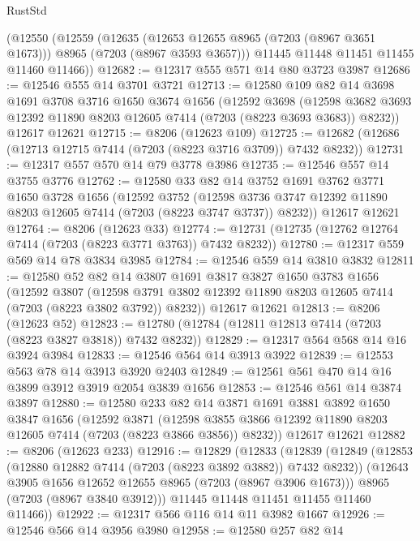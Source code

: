 \begin{lexlean}{RustStd}
\begin{coremodule}
    (@12550
      (@12559
        (@12635 (@12653 @12655 @8965 (@7203 (@8967 @3651 @1673))) @8965 (@7203 (@8967 @3593 @3657)))
        @11445
        @11448
        @11451
        @11455
        @11460
        @11466))
@12682 := @12317 @555 @571 @14 @80 @3723 @3987
@12686 := @12546 @555 @14 @3701 @3721
@12713 := @12580
    @109
    @82
    @14
    @3698
    @1691
    @3708
    @3716
    @1650
    @3674
    @1656
    (@12592
      @3698
      (@12598 @3682 @3693 @12392 @11890 @8203 @12605 @7414 (@7203 (@8223 @3693 @3683)) @8232))
    @12617
    @12621
@12715 := @8206 (@12623 @109)
@12725 := @12682 (@12686 (@12713 @12715 @7414 (@7203 (@8223 @3716 @3709)) @7432 @8232))
@12731 := @12317 @557 @570 @14 @79 @3778 @3986
@12735 := @12546 @557 @14 @3755 @3776
@12762 := @12580
    @33
    @82
    @14
    @3752
    @1691
    @3762
    @3771
    @1650
    @3728
    @1656
    (@12592
      @3752
      (@12598 @3736 @3747 @12392 @11890 @8203 @12605 @7414 (@7203 (@8223 @3747 @3737)) @8232))
    @12617
    @12621
@12764 := @8206 (@12623 @33)
@12774 := @12731 (@12735 (@12762 @12764 @7414 (@7203 (@8223 @3771 @3763)) @7432 @8232))
@12780 := @12317 @559 @569 @14 @78 @3834 @3985
@12784 := @12546 @559 @14 @3810 @3832
@12811 := @12580
    @52
    @82
    @14
    @3807
    @1691
    @3817
    @3827
    @1650
    @3783
    @1656
    (@12592
      @3807
      (@12598 @3791 @3802 @12392 @11890 @8203 @12605 @7414 (@7203 (@8223 @3802 @3792)) @8232))
    @12617
    @12621
@12813 := @8206 (@12623 @52)
@12823 := @12780 (@12784 (@12811 @12813 @7414 (@7203 (@8223 @3827 @3818)) @7432 @8232))
@12829 := @12317 @564 @568 @14 @16 @3924 @3984
@12833 := @12546 @564 @14 @3913 @3922
@12839 := @12553 @563 @78 @14 @3913 @3920 @2403
@12849 := @12561 @561 @470 @14 @16 @3899 @3912 @3919 @2054 @3839 @1656
@12853 := @12546 @561 @14 @3874 @3897
@12880 := @12580
    @233
    @82
    @14
    @3871
    @1691
    @3881
    @3892
    @1650
    @3847
    @1656
    (@12592
      @3871
      (@12598 @3855 @3866 @12392 @11890 @8203 @12605 @7414 (@7203 (@8223 @3866 @3856)) @8232))
    @12617
    @12621
@12882 := @8206 (@12623 @233)
@12916 := @12829
    (@12833
      (@12839
        (@12849
          (@12853 (@12880 @12882 @7414 (@7203 (@8223 @3892 @3882)) @7432 @8232))
          (@12643 @3905 @1656 @12652 @12655 @8965 (@7203 (@8967 @3906 @1673)))
          @8965
          (@7203 (@8967 @3840 @3912)))
        @11445
        @11448
        @11451
        @11455
        @11460
        @11466))
@12922 := @12317 @566 @116 @14 @11 @3982 @1667
@12926 := @12546 @566 @14 @3956 @3980
@12958 := @12580
    @257
    @82
    @14

\end{coremodule}
\end{lexlean}
